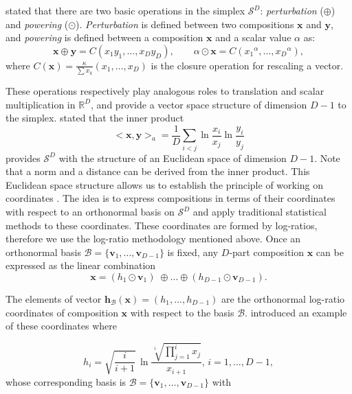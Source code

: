 \documentclass[12pt, a4paper]{article}
\begin{document}
 \noindent \cite{aitchison1986statistical} stated that  there are two basic operations in the simplex $\mathcal{S}^D$: \emph{perturbation} ($\oplus$) and 
 \emph{powering} ($\odot$). \emph{Perturbation} is defined between two compositions $\textbf{x}$ 
and $\textbf{y}$,  and \emph{powering} is defined between a composition $\textbf{x}$ and a scalar value $\alpha$ as:
\begin{equation}
\textbf{x} \oplus \textbf{y} =  C( x_1 y_1, \dots, x_D y_D), \qquad \alpha
 \odot \textbf{x} =  C( {x_1}^\alpha, \dots, {x_D}^\alpha),
\label{pert_pow}
\end{equation}
where $C(\textbf{x})=\frac{\kappa}{\sum x_k}(x_1, \dots, x_D) $ is the closure operation for rescaling a vector.

These operations respectively play analogous roles to translation and scalar multiplication in $\mathbb{R}^D$, and provide a vector space
structure of dimension $D-1$ to the simplex. \cite{pawlowsky2001geometric} stated that the inner product 
\begin{equation}
<\textbf{x}, \textbf{y}>_a = \frac{1}{D} \sum_{i < j} \ln \frac{x_i}{x_j} \ln \frac{y_i}{y_j}
\label{inner_prod}
\end{equation}
 provides $\mathcal{S}^D$ with the structure of an Euclidean space of dimension $D-1$. Note that a norm and a distance can be derived from the inner product.
This Euclidean space structure allows us to establish the principle of working on coordinates \citep{figueras2011principle}. The idea is to express compositions in terms of their coordinates with respect to an orthonormal basis on $\mathcal{S}^D$ and apply
traditional statistical methods to these coordinates. These coordinates are formed by log-ratios, therefore we use the log-ratio methodology mentioned above. Once an orthonormal basis $\mathcal{B} = \{\textbf{v}_1, \dots, \textbf{v}_{D-1}\}$ is fixed, any $D$-part composition $\textbf{x}$ can be expressed as the linear combination
\[
\textbf{x} = (h_1 \odot \textbf{v}_1)\; \oplus \dots  \oplus (h_{D-1} \odot \textbf{v}_{D-1}).
\]

The elements of vector $\textbf{h}_\mathcal{B}(\textbf{x})=(h_1, \dots, h_{D-1})$ are the orthonormal log-ratio coordinates of composition $\textbf{x}$ with respect to the basis $\mathcal{B}$. \cite{egozcue2003isometric} introduced an example of these coordinates where

\begin{equation}
\label{eilr}
h_i=\sqrt{\frac{i}{i+1}}\,\ln\frac{\sqrt[i]
{\prod_{j=1}^{i} x_j}}{x_{i+1}},\,i=1,\dots,D-1,
\end{equation}
whose corresponding basis is $\mathcal{B} = \{\textbf{v}_1, \dots, \textbf{v}_{D-1}\}$ with
\end{document}
